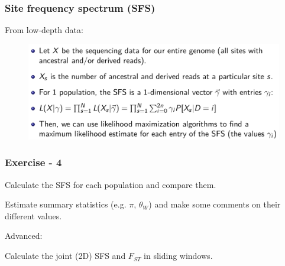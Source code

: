 \begin{frame}
\frametitle{Site frequency spectrum (SFS)}

	From low-depth data:

        \begin{figure}
                \includegraphics[width=\textwidth]{Pics/sfs_low.png}
        \end{figure}


\end{frame}


\begin{frame}
\frametitle{Exercise - 4}

	Calculate the SFS for each population and compare them.

	Estimate summary statistics (e.g. $\pi$, $\theta_W$) and make some comments on their different values.

	Advanced:
	
	Calculate the joint (2D) SFS and $F_{ST}$ in sliding windows.

\end{frame}


